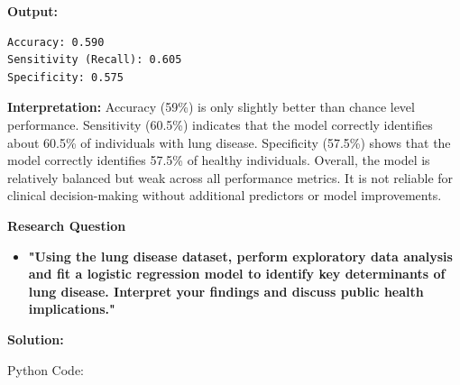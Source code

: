 \documentclass[12pt]{article}
\begin{document}
\vspace{2cm}

\textbf{Output:}

\vspace{0.3cm}

\begin{verbatim}
Accuracy: 0.590
Sensitivity (Recall): 0.605
Specificity: 0.575
\end{verbatim}

\vspace{0.4cm}

\textbf{Interpretation:}
Accuracy (59\%) is only slightly better than chance level performance.
Sensitivity (60.5\%) indicates that the model correctly identifies about 60.5\% of individuals with lung disease.
Specificity (57.5\%) shows that the model correctly identifies 57.5\% of healthy individuals.
Overall, the model is relatively balanced but weak across all performance metrics. It is not reliable for clinical decision-making without additional predictors or model improvements.

\vspace{1.5cm}

{\large \textbf{Research Question}}

\vspace{0.3cm}

\begin{itemize}
    \item\textbf{"Using the lung disease dataset, perform exploratory data analysis and fit a logistic regression model to identify key determinants of lung disease. Interpret your findings and discuss public health implications."}
\end{itemize}

{\large\textbf{Solution:}}

\vspace{0.1cm}

{\large{Python Code:}}

\vspace{0.2cm}
\end{document}

